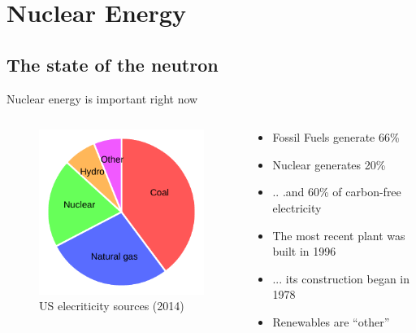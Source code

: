 \documentclass{beamer}
\begin{document}
\section{Nuclear Energy}

    \subsection{The state of the neutron}

        \begin{frame}{Nuclear energy is important right now}

            \begin{columns}[T]

                \begin{column}{0.5\textwidth}
                    \begin{figure}
                        \centering
                        \includegraphics{./img/sources.pdf}
                        \caption*{US elecriticity sources (2014)}
                    \end{figure}
                \end{column}

                \begin{column}{0.5\textwidth}
                    \begin{itemize}
                        \item Fossil Fuels generate 66\%
                        \pause
                        \item Nuclear generates 20\%
                        \pause
                        \item .. .and 60\% of carbon-free electricity
                        \pause
                        \item The most recent plant was built in 1996
                        \pause
                        \item ... its construction began in 1978
                        \pause
                        \item Renewables are ``other''
                    \end{itemize}
                \end{column}

            \end{columns}

        \end{frame}
\end{document}
